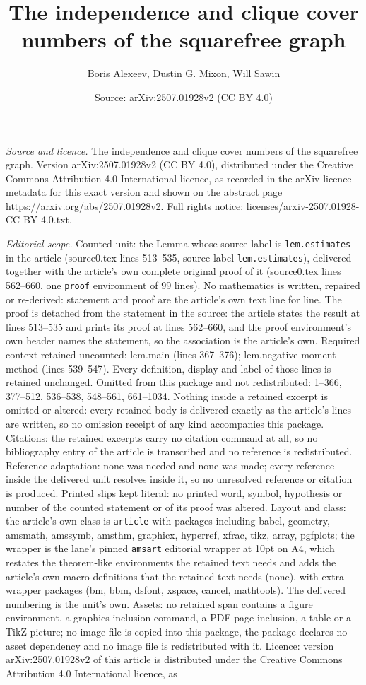 \documentclass[10pt,a4paper]{amsart}
\title[The independence and clique cover numbers of the squarefree ]{The independence and clique cover numbers of the squarefree graph}
\author{Boris Alexeev, Dustin G. Mixon, Will Sawin}
\date{Source: arXiv:2507.01928v2 (CC BY 4.0)}
\begin{document}
\maketitle

\noindent\emph{Source and licence.} The independence and clique cover numbers of the squarefree graph. Version arXiv:2507.01928v2 (CC BY 4.0), distributed under the Creative Commons Attribution 4.0 International licence, as recorded in the arXiv licence metadata for this exact version and shown on the abstract page https://arxiv.org/abs/2507.01928v2. Full rights notice: licenses/arxiv-2507.01928-CC-BY-4.0.txt.\par\smallskip

\noindent\textit{Editorial scope.} Counted unit: the Lemma whose source label is \texttt{lem.estimates} in the article (source0.tex lines 513--535, source label \texttt{lem.estimates}), delivered together with the article's own complete original proof of it (source0.tex lines 562--660, one \texttt{proof} environment of 99 lines). No mathematics is written, repaired or re-derived: statement and proof are the article's own text line for line. The proof is detached from the statement in the source: the article states the result at lines 513--535 and prints its proof at lines 562--660, and the proof environment's own header names the statement, so the association is the article's own. Required context retained uncounted: lem.main (lines 367--376); lem.negative moment method (lines 539--547). Every definition, display and label of those lines is retained unchanged. Omitted from this package and not redistributed: 1--366, 377--512, 536--538, 548--561, 661--1034. Nothing inside a retained excerpt is omitted or altered: every retained body is delivered exactly as the article's lines are written, so no omission receipt of any kind accompanies this package. Citations: the retained excerpts carry no citation command at all, so no bibliography entry of the article is transcribed and no reference is redistributed. Reference adaptation: none was needed and none was made; every reference inside the delivered unit resolves inside it, so no unresolved reference or citation is produced. Printed slips kept literal: no printed word, symbol, hypothesis or number of the counted statement or of its proof was altered. Layout and class: the article's own class is \texttt{article} with packages including babel, geometry, amsmath, amssymb, amsthm, graphicx, hyperref, xfrac, tikz, array, pgfplots; the wrapper is the lane's pinned \texttt{amsart} editorial wrapper at 10pt on A4, which restates the theorem-like environments the retained text needs and adds the article's own macro definitions that the retained text needs (none), with extra wrapper packages (bm, bbm, dsfont, xspace, cancel, mathtools). The delivered numbering is the unit's own. Assets: no retained span contains a figure environment, a graphics-inclusion command, a PDF-page inclusion, a table or a TikZ picture; no image file is copied into this package, the package declares no asset dependency and no image file is redistributed with it. Licence: version arXiv:2507.01928v2 of this article is distributed under the Creative Commons Attribution 4.0 International licence, as 
\end{document}
